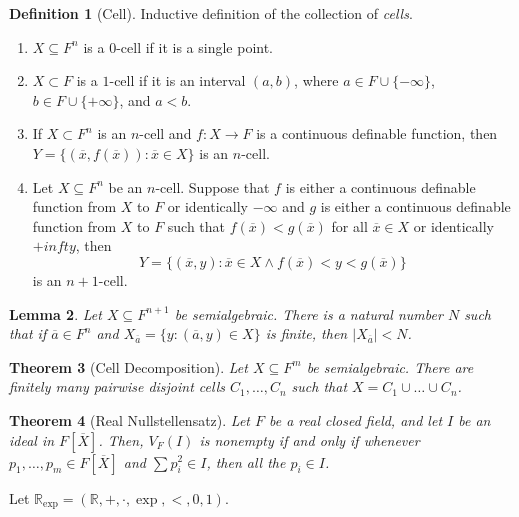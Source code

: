 \documentclass{amsart}
\newtheorem{theorem}{Theorem}[subsection]
\newtheorem{lemma}[theorem]{Lemma}
\theoremstyle{definition}
\newtheorem{definition}[theorem]{Definition}
\numberwithin{equation}{section}
\begin{document}
\begin{definition}[Cell]
    Inductive definition of the collection of \emph{cells}.
    \begin{enumerate}[label = {$\bullet$}]
        \item $X \subseteq F^n$ is a $0$-cell if it is a single point.
        \item $X \subset F$ is a $1$-cell if it is an interval $(a,b)$,
          where $a \in F \cup \{-\infty\}$, $b\in F\cup \{+\infty\}$, and $a < b$.
        \item If $X \subset F^n$ is an $n$-cell and $f: X\to F$ is a continuous definable function,
          then $Y = \{(\overline{x},f(\overline{x})): \overline{x} \in X\}$ is an $n$-cell.
        \item Let $X \subseteq F^n$ be an $n$-cell. Suppose that $f$ is
          either a continuous definable function from $X$ to $F$ or identically $-\infty$ and
          $g$ is either a continuous definable function from $X$ to $F$
          such that $f(\overline{x}) < g(\overline{x})$ for all $\overline{x} \in X$ or identically $+infty$, then 
        \[
        Y = \{(\overline{x},y): \overline{x} \in X \land f(\overline{x}) < y < g(\overline{x})\}
        \]
        is an $n+1$-cell.
    \end{enumerate}
\end{definition}

\begin{lemma}
    Let $X \subseteq F^{n+1}$ be semialgebraic.
    There is a natural number $N$ such that if $\overline{a}\in F^n$
    and $X_{\overline{a}} = \{y: (\overline{a},y)\in X\}$ is finite,
    then $|X_{\overline{a}}| < N$.
\end{lemma}

\begin{theorem}[Cell Decomposition]
    Let $X \subseteq F^m$ be semialgebraic.
    There are finitely many pairwise disjoint cells $C_1,\dots,C_n$ such that $X = C_1 \cup \dots \cup C_n$.
\end{theorem}

\begin{theorem}[Real Nullstellensatz]
    Let $F$ be a real closed field,
    and let $I$ be an ideal in $F[\overline{X}]$.
    Then, $V_F(I)$ is nonempty if and only if whenever $p_1,\dots,p_m\in F[\overline{X}]$ and $\sum p_i^2 \in I$,
    then all the $p_i \in I$. 
\end{theorem}

Let $\mathbb{R}_{\exp} = (\mathbb{R},+,\cdot,\exp,<,0,1)$.
\end{document}
